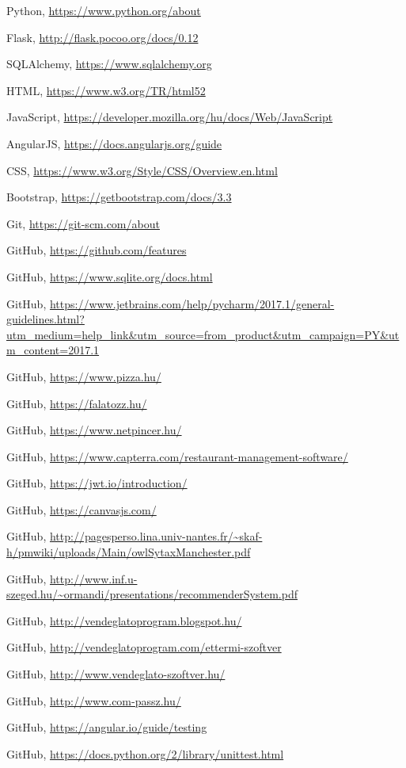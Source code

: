 \begin{thebibliography}{x}

Python, \url{https://www.python.org/about}

Flask, \url{http://flask.pocoo.org/docs/0.12}

SQLAlchemy, \url{https://www.sqlalchemy.org}

HTML, \url{https://www.w3.org/TR/html52}

JavaScript, \url{https://developer.mozilla.org/hu/docs/Web/JavaScript}

AngularJS, \url{https://docs.angularjs.org/guide}

CSS, \url{https://www.w3.org/Style/CSS/Overview.en.html}

Bootstrap, \url{https://getbootstrap.com/docs/3.3}

Git, \url{https://git-scm.com/about}

GitHub, \url{https://github.com/features}

GitHub, \url{https://www.sqlite.org/docs.html}

GitHub, \url{https://www.jetbrains.com/help/pycharm/2017.1/general-guidelines.html?utm_medium=help_link&utm_source=from_product&utm_campaign=PY&utm_content=2017.1}


GitHub, \url{https://www.pizza.hu/}

GitHub, \url{https://falatozz.hu/}

GitHub, \url{https://www.netpincer.hu/}

GitHub, \url{https://www.capterra.com/restaurant-management-software/}

GitHub, \url{https://jwt.io/introduction/}

GitHub, \url{https://canvasjs.com/}

GitHub, \url{http://pagesperso.lina.univ-nantes.fr/~skaf-h/pmwiki/uploads/Main/owlSytaxManchester.pdf}

GitHub, \url{http://www.inf.u-szeged.hu/~ormandi/presentations/recommenderSystem.pdf}

GitHub, \url{http://vendeglatoprogram.blogspot.hu/}

GitHub, \url{http://vendeglatoprogram.com/ettermi-szoftver}

GitHub, \url{http://www.vendeglato-szoftver.hu/}

GitHub, \url{http://www.com-passz.hu/}

GitHub, \url{https://angular.io/guide/testing}

GitHub, \url{https://docs.python.org/2/library/unittest.html}


\end{thebibliography}
